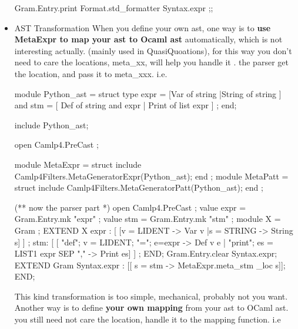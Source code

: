 \begin{itemize}
\begin{bluecode}
Gram.Entry.print Format.std_formatter Syntax.expr ;; 
\end{bluecode}



 \item AST Transformation 
  When you define your own ast, one way is to {\bf use MetaExpr to map your ast to Ocaml ast}
  automatically, which is not interesting actually. (mainly used in QuasiQuoations), for this way you don't need to care the locations, meta\_xx, will help you handle it . the parser
  get the location, and pass it to meta\_xxx. i.e. 


\begin{bluecode}
module Python_ast = struct 
  type expr  = 
    [Var of string 
    |String of string  ]
  and stm   = 
    [ Def of string and expr 
    | Print of list expr ] ; 
end; 

include Python_ast;

open Camlp4.PreCast ; 

module MetaExpr = struct 
  include Camlp4Filters.MetaGeneratorExpr(Python_ast);
end ; 
module MetaPatt = struct 
  include Camlp4Filters.MetaGeneratorPatt(Python_ast);
end ; 

(** now the parser part *)
open Camlp4.PreCast ; 
value expr = Gram.Entry.mk "expr" ; 
value stm = Gram.Entry.mk "stm" ;
module X = Gram ; 
EXTEND X 
  expr : [
    [v = LIDENT -> Var v
    |s = STRING ->  String s]
  ]
  ;
  stm: [
    [ "def"; v = LIDENT; "="; e=expr -> Def v e
    | "print"; es = LIST1 expr SEP "," -> Print es]
  ]
  ;
END;  
Gram.Entry.clear Syntax.expr; 
EXTEND Gram 
  Syntax.expr : 
  [[ s = stm -> MetaExpr.meta_stm  _loc  s]]; 
END; 

\end{bluecode}


This kind transformation is too simple, mechanical, probably not you want.  
Another way is to define {\bf your own mapping} from your ast to OCaml ast. you still need not care the location, handle it to the mapping function. i.e 



\end{itemize}
